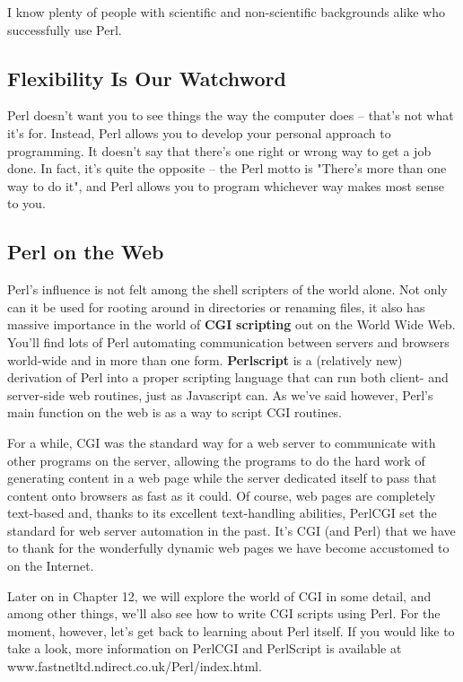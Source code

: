 \documentclass[a4paper,11pt]{book}
\begin{document}
\noindent I know plenty of people with scientific and non-scientific backgrounds alike who successfully use Perl.

\subsection{Flexibility Is Our Watchword}

\noindent Perl doesn't want you to see things the way the computer does -- that's not what it's for. Instead, Perl allows you to develop your personal approach to programming. It doesn't say that there's one right or wrong way to get a job done. In fact, it's quite the opposite -- the Perl motto is "There's more than one way to do it", and Perl allows you to program whichever way makes most sense to you.

\subsection{Perl on the Web}

\noindent Perl's influence is not felt among the shell scripters of the world alone. Not only can it be used for rooting around in directories or renaming files, it also has massive importance in the world of \textbf{CGI} \textbf{scripting }out on the World Wide Web. You'll find lots of Perl automating communication between servers and browsers world-wide and in more than one form. \textbf{Perlscript} is a (relatively  new) derivation of Perl into a  proper scripting language that can run both client-  and server-side  web routines,  just as Javascript can.  As  we've  said  however,  Perl's  main  function  on  the web  is  as  a  way to script CGI routines.

\noindent 

\noindent For a while, CGI was the standard way for a web server to communicate with other programs on the server, allowing the programs to do the hard work of generating content in a web page while the server dedicated itself to pass that content onto browsers as fast as it could. Of course, web pages are completely text-based and, thanks to its excellent text-handling abilities, PerlCGI set the standard for web server automation in the past. It's CGI (and Perl) that we have to thank for the wonderfully dynamic web pages we have become accustomed to on the Internet.

\noindent 

\noindent Later on in Chapter 12, we will explore the world of CGI in some detail, and among other things, we'll also see how to write CGI scripts using Perl. For the moment, however, let's get back to learning about Perl itself. If you would like to take a look, more information on PerlCGI and PerlScript is available at www.fastnetltd.ndirect.co.uk/Perl/index.html.
\end{document}
